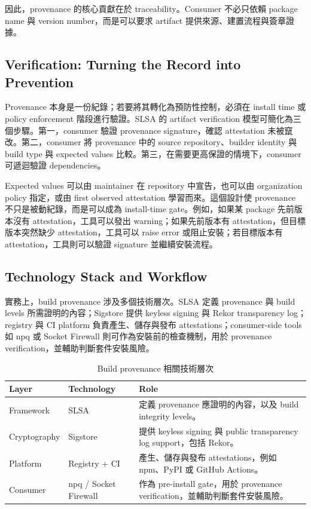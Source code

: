 \documentclass[12pt,a4paper]{article}
\begin{document}
因此，provenance 的核心貢獻在於 traceability。Consumer 不必只依賴 package name 與 version number，而是可以要求 artifact 提供來源、建置流程與簽章證據。

\subsection{Verification: Turning the Record into Prevention}

Provenance 本身是一份紀錄；若要將其轉化為預防性控制，必須在 install time 或 policy enforcement 階段進行驗證。SLSA 的 artifact verification 模型可簡化為三個步驟。第一，consumer 驗證 provenance signature，確認 attestation 未被竄改。第二，consumer 將 provenance 中的 source repository、builder identity 與 build type 與 expected values 比較。第三，在需要更高保證的情境下，consumer 可遞迴驗證 dependencies。

Expected values 可以由 maintainer 在 repository 中宣告，也可以由 organization policy 指定，或由 first observed attestation 學習而來。這個設計使 provenance 不只是被動紀錄，而是可以成為 install-time gate。例如，如果某 package 先前版本沒有 attestation，工具可以發出 warning；如果先前版本有 attestation，但目標版本突然缺少 attestation，工具可以 raise error 或阻止安裝；若目標版本有 attestation，工具則可以驗證 signature 並繼續安裝流程。

\subsection{Technology Stack and Workflow}

實務上，build provenance 涉及多個技術層次。SLSA 定義 provenance 與 build levels 所需證明的內容；Sigstore 提供 keyless signing 與 Rekor transparency log；registry 與 CI platform 負責產生、儲存與發布 attestations；consumer-side tools 如 npq 或 Socket Firewall 則可作為安裝前的檢查機制，用於 provenance verification，並輔助判斷套件安裝風險。

\begin{table}[h]
\centering
\caption{Build provenance 相關技術層次}
\begin{tabularx}{\textwidth}{P{3.2cm}P{4cm}Y}
\toprule
\textbf{Layer} & \textbf{Technology} & \textbf{Role} \\
\midrule
Framework & SLSA & 定義 provenance 應證明的內容，以及 build integrity levels。 \\
Cryptography & Sigstore & 提供 keyless signing 與 public transparency log support，包括 Rekor。 \\
Platform & Registry + CI & 產生、儲存與發布 attestations，例如 npm、PyPI 或 GitHub Actions。 \\
Consumer & npq / Socket Firewall & 作為 pre-install gate，用於 provenance verification，並輔助判斷套件安裝風險。 \\
\bottomrule
\end{tabularx}
\end{table}
\end{document}
